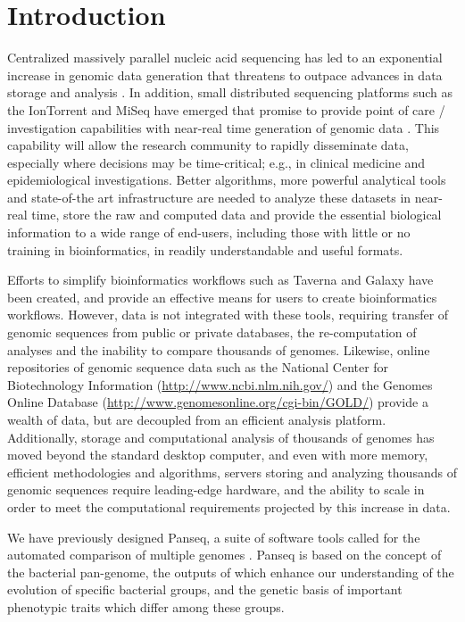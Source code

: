 \documentclass[letterpaper,12pt]{report}
\begin{document}

\section{Introduction}
Centralized massively parallel nucleic acid sequencing has led to an exponential increase in genomic data generation that threatens to outpace advances in data storage and analysis \cite{kahn_future_2011,teeling_current_2012}. In addition, small distributed sequencing platforms such as the IonTorrent and MiSeq have emerged that promise to provide point of care / investigation capabilities with near-real time generation of genomic data \cite{loman_performance_2012}. This capability will allow the research community to rapidly disseminate data, especially where decisions may be time-critical; e.g., in clinical medicine and epidemiological investigations. Better algorithms, more powerful analytical tools and state-of-the art infrastructure are needed to analyze these datasets in near-real time, store the raw and computed data and provide the essential biological information to a wide range of end-users, including those with little or no training in bioinformatics, in readily understandable and useful formats.

Efforts to simplify bioinformatics workflows such as Taverna \cite{lanzen_taverna_2008} and Galaxy \cite{goecks_galaxy:_2010} have been created, and provide an effective means for users to create bioinformatics workflows. However, data is not integrated with these tools, requiring transfer of genomic sequences from public or private databases, the re-computation of analyses and the inability to compare thousands of genomes. Likewise, online repositories of genomic sequence data such as the National Center for Biotechnology Information (\url{http://www.ncbi.nlm.nih.gov/}) and the Genomes Online Database (\url{http://www.genomesonline.org/cgi-bin/GOLD/}) provide a wealth of data, but are decoupled from an efficient analysis platform. Additionally, storage and computational analysis of thousands of genomes has moved beyond the standard desktop computer, and even with more memory, efficient methodologies and algorithms, servers storing and analyzing thousands of genomic sequences require leading-edge hardware, and the ability to scale in order to meet the computational requirements projected by this increase in data.

We have previously designed Panseq, a suite of software tools called for the automated comparison of multiple genomes \cite{laing_pan-genome_2010,laing_identification_2011}. Panseq is based on the concept of the bacterial pan-genome, the outputs of which enhance our understanding of the evolution of specific bacterial groups, and the genetic basis of important phenotypic traits which differ among these groups.
\end{document}
